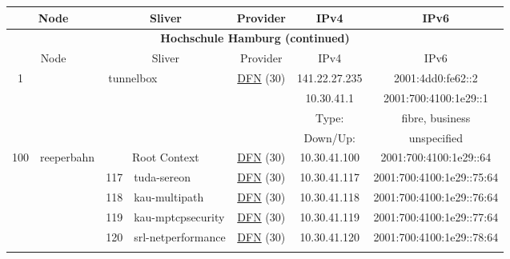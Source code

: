 \begin{small}
\begin{center}
\begin{longtable}{|c|c|c|c|c|c|c|c|}
 \multicolumn{2}{|p{8em}|}{Node} & \multicolumn{2}{|p{8em}|}{Sliver} & \multicolumn{2}{|p{8em}|}{Provider} & IPv4 & IPv6 \\ \hline
\endfirsthead
\hline
 \multicolumn{8}{|c|}{\textbf{Hochschule Hamburg (continued)}} \\ \hline
 \multicolumn{2}{|p{8em}|}{Node} & \multicolumn{2}{|p{8em}|}{Sliver} & \multicolumn{2}{|p{8em}|}{Provider} & IPv4 & IPv6 \\ \hline
\endhead
 \multirow{4}{*}{\tiny{1}} & \multicolumn{3}{|c|}{\multirow{4}{*}{\tiny{tunnelbox}}} & \multicolumn{2}{|c|}{\multirow{4}{*}{\tiny{\href{https://www.dfn.de}{DFN} (30)}}} & \tiny{141.22.27.235} & \tiny{2001:4dd0:fe62::2} \\* \cline{7-7}\cline{8-8}
  & \multicolumn{3}{|c|}{} & \multicolumn{2}{|c|}{} & \tiny{10.30.41.1} & \tiny{2001:700:4100:1e29::1} \\* \cline{7-7}\cline{8-8}
  & \multicolumn{3}{|c|}{} & \multicolumn{2}{|c|}{} & Type: & fibre, business \\* \cline{7-7}\cline{8-8}
  & \multicolumn{3}{|c|}{} & \multicolumn{2}{|c|}{} & Down/Up:  & unspecified \\ \hline
 \multirow{24}{*}{\tiny{100}} & \multicolumn{1}{|l|}{\multirow{24}{*}{\tiny{reeperbahn}}} & \multicolumn{2}{|c|}{\tiny{Root Context}} & \multicolumn{2}{|c|}{\tiny{\href{https://www.dfn.de}{DFN} (30)}} & \tiny{10.30.41.100} & \tiny{2001:700:4100:1e29::64} \\* \cline{3-3}\cline{4-4}\cline{5-5}\cline{6-6}\cline{7-7}\cline{8-8}
  &  & \tiny{117} & \multicolumn{1}{|l|}{\tiny{tuda-sereon}} & \multicolumn{2}{|c|}{\tiny{\href{https://www.dfn.de}{DFN} (30)}} & \tiny{10.30.41.117} & \tiny{2001:700:4100:1e29::75:64} \\* \cline{3-3}\cline{4-4}\cline{5-5}\cline{6-6}\cline{7-7}\cline{8-8}
  &  & \tiny{118} & \multicolumn{1}{|l|}{\tiny{kau-multipath}} & \multicolumn{2}{|c|}{\tiny{\href{https://www.dfn.de}{DFN} (30)}} & \tiny{10.30.41.118} & \tiny{2001:700:4100:1e29::76:64} \\* \cline{3-3}\cline{4-4}\cline{5-5}\cline{6-6}\cline{7-7}\cline{8-8}
  &  & \tiny{119} & \multicolumn{1}{|l|}{\tiny{kau-mptcpsecurity}} & \multicolumn{2}{|c|}{\tiny{\href{https://www.dfn.de}{DFN} (30)}} & \tiny{10.30.41.119} & \tiny{2001:700:4100:1e29::77:64} \\* \cline{3-3}\cline{4-4}\cline{5-5}\cline{6-6}\cline{7-7}\cline{8-8}
  &  & \tiny{120} & \multicolumn{1}{|l|}{\tiny{srl-netperformance}} & \multicolumn{2}{|c|}{\tiny{\href{https://www.dfn.de}{DFN} (30)}} & \tiny{10.30.41.120} & \tiny{2001:700:4100:1e29::78:64} \\* \cline{3-3}\cline{4-4}\cline{5-5}\cline{6-6}\cline{7-7}\cline{8-8}

\end{longtable}
\end{center}
\end{small}
